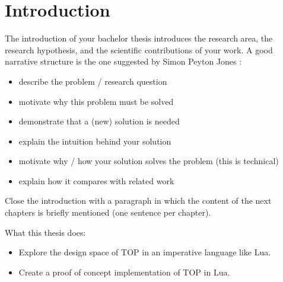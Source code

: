 \chapter{Introduction}\label{introduction}
The introduction of your bachelor thesis introduces the research area, the
research hypothesis, and the scientific contributions of your work.
A good narrative structure is the one suggested by Simon Peyton Jones
\cite{peys04:HowToWriteAGoodResearchPaper}:
%
\begin{itemize}
\item describe the problem / research question
\item motivate why this problem must be solved
\item demonstrate that a (new) solution is needed
\item explain the intuition behind your solution
\item motivate why / how your solution solves the problem (this is technical)
\item explain how it compares with related work
\end{itemize}
%
Close the introduction with a paragraph in which the content of the next chapters
is briefly mentioned (one sentence per chapter). 

\bigskip\noindent
What this thesis does:
\begin{itemize}
    \item Explore the design space of TOP in an imperative language like Lua.
    \item Create a proof of concept implementation of TOP in Lua.
\end{itemize}
